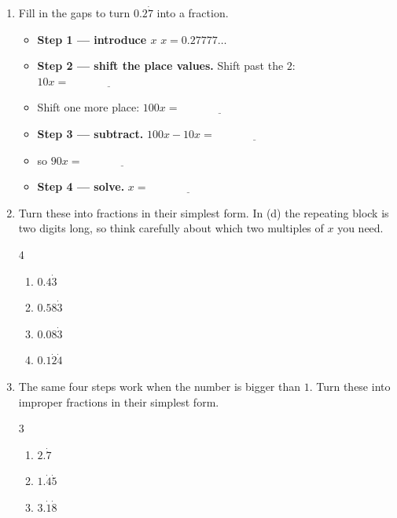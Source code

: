 \documentclass[12pt,a4paper]{article}
\newcommand{\ansline}[1][2.2cm]{\underline{\hspace{#1}}}
\begin{document}
\begin{enumerate}[resume]

\item Fill in the gaps to turn $0.2\dot{7}$ into a fraction.
\begin{itemize}[label={},leftmargin=1.8em,itemsep=12pt,topsep=6pt]
  \item \textbf{Step 1 --- introduce $x$} \hfill $x=0.27777\ldots$
  \item \textbf{Step 2 --- shift the place values.} Shift past the $2$:
        \hfill $10x=\ansline[3cm]$
  \item \hspace*{1.2em}Shift one more place: \hfill $100x=\ansline[3cm]$
  \item \textbf{Step 3 --- subtract.} \hfill $100x-10x=\ansline[3cm]$
  \item \hspace*{1.2em}so \hfill $90x=\ansline[3cm]$
  \item \textbf{Step 4 --- solve.} \hfill $x=\ansline[3cm]$
\end{itemize}

\newpage

\item Turn these into fractions in their simplest form. In (d) the repeating
block is two digits long, so think carefully about which two multiples of $x$
you need.
\begin{multicols}{4}
\begin{enumerate}
  \item $0.4\dot{3}$
  \item $0.58\dot{3}$
  \item $0.08\dot{3}$
  \item $0.1\dot{2}\dot{4}$
\end{enumerate}
\end{multicols}
\vspace{13em}

\item The same four steps work when the number is bigger than $1$. Turn
these into improper fractions in their simplest form.
\begin{multicols}{3}
\begin{enumerate}
  \item $2.\dot{7}$
  \item $1.\dot{4}\dot{5}$
  \item $3.\dot{1}\dot{8}$
\end{enumerate}
\end{multicols}
\vspace{13em}


\end{enumerate}
\end{document}
